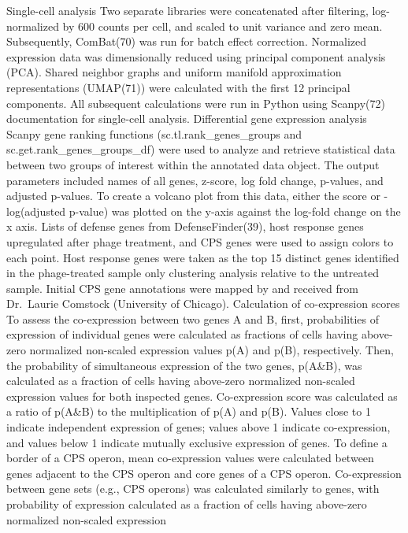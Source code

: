 \documentclass[
  11pt,
  a4paper,
]{report}
\begin{document}
Single-cell analysis Two separate libraries were concatenated after
filtering, log-normalized by 600 counts per cell, and scaled to unit
variance and zero mean. Subsequently, ComBat(70) was run for batch
effect correction. Normalized expression data was dimensionally reduced
using principal component analysis (PCA). Shared neighbor graphs and
uniform manifold approximation representations (UMAP(71)) were
calculated with the first 12 principal components. All subsequent
calculations were run in Python using Scanpy(72) documentation for
single-cell analysis. Differential gene expression analysis Scanpy gene
ranking functions (sc.tl.rank\_genes\_groups and
sc.get.rank\_genes\_groups\_df) were used to analyze and retrieve
statistical data between two groups of interest within the annotated
data object. The output parameters included names of all genes, z-score,
log fold change, p-values, and adjusted p-values. To create a volcano
plot from this data, either the \textbar score\textbar{} or
-log(adjusted p-value) was plotted on the y-axis against the log-fold
change on the x axis. Lists of defense genes from DefenseFinder(39),
host response genes upregulated after phage treatment, and CPS genes
were used to assign colors to each point. Host response genes were taken
as the top 15 distinct genes identified in the phage-treated sample only
clustering analysis relative to the untreated sample. Initial CPS gene
annotations were mapped by and received from Dr.~Laurie Comstock
(University of Chicago). Calculation of co-expression scores To assess
the co-expression between two genes A and B, first, probabilities of
expression of individual genes were calculated as fractions of cells
having above-zero normalized non-scaled expression values p(A) and p(B),
respectively. Then, the probability of simultaneous expression of the
two genes, p(A\&B), was calculated as a fraction of cells having
above-zero normalized non-scaled expression values for both inspected
genes. Co-expression score was calculated as a ratio of p(A\&B) to the
multiplication of p(A) and p(B). Values close to 1 indicate independent
expression of genes; values above 1 indicate co-expression, and values
below 1 indicate mutually exclusive expression of genes. To define a
border of a CPS operon, mean co-expression values were calculated
between genes adjacent to the CPS operon and core genes of a CPS operon.
Co-expression between gene sets (e.g., CPS operons) was calculated
similarly to genes, with probability of expression calculated as a
fraction of cells having above-zero normalized non-scaled expression
\end{document}
